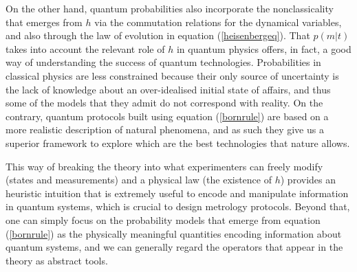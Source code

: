 On the other hand, quantum probabilities also incorporate the nonclassicality that emerges from $h$ via the commutation relations for the dynamical variables, and also through the law of evolution in equation (\ref{heisenbergeq}). That $p(m|t)$ takes into account the relevant role of $h$ in quantum physics offers, in fact, a good way of understanding the success of quantum technologies. Probabilities in classical physics are less constrained because their only source of uncertainty is the lack of knowledge about an over-idealised initial state of affairs, and thus some of the models that they admit do not correspond with reality. On the contrary, quantum protocols built using equation (\ref{bornrule}) are based on a more realistic description of natural phenomena, and as such they give us a superior framework to explore which are the best technologies that nature allows.

This way of breaking the theory into what experimenters can freely modify (states and measurements) and a physical law (the existence of $h$) provides an heuristic intuition that is extremely useful to encode and manipulate information in quantum systems, which is crucial to design metrology protocols. Beyond that, one can simply focus on the probability models that emerge from equation (\ref{bornrule}) as the physically meaningful quantities encoding information about quantum systems, and we can generally regard the operators that appear in the theory as abstract tools.

